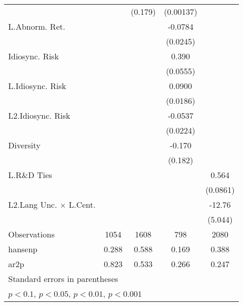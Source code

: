 \begin{table}
\begin{center}
{\begin{tabular}{l*{4}{c}}
                    &                     &     (0.179)         &   (0.00137)         &                     \\
L.Abnorm. Ret.      &                     &                     &     -0.0784\sym{**} &                     \\
                    &                     &                     &    (0.0245)         &                     \\
Idiosync. Risk      &                     &                     &       0.390\sym{***}&                     \\
                    &                     &                     &    (0.0555)         &                     \\
L.Idiosync. Risk    &                     &                     &      0.0900\sym{***}&                     \\
                    &                     &                     &    (0.0186)         &                     \\
L2.Idiosync. Risk   &                     &                     &     -0.0537\sym{*}  &                     \\
                    &                     &                     &    (0.0224)         &                     \\
Diversity           &                     &                     &      -0.170         &                     \\
                    &                     &                     &     (0.182)         &                     \\
L.R\&D Ties         &                     &                     &                     &       0.564\sym{***}\\
                    &                     &                     &                     &    (0.0861)         \\
L2.Lang Unc. $\times$ L.Cent.&                     &                     &                     &      -12.76\sym{*}  \\
                    &                     &                     &                     &     (5.044)         \\
\hline
Observations        &        1054         &        1608         &         798         &        2080         \\
hansenp             &       0.288         &       0.588         &       0.169         &       0.388         \\
ar2p                &       0.823         &       0.533         &       0.266         &       0.247         \\
\hline\hline
\multicolumn{5}{l}{\footnotesize Standard errors in parentheses}\\
\multicolumn{5}{l}{\footnotesize \sym{+} \(p<0.1\), \sym{*} \(p<0.05\), \sym{**} \(p<0.01\), \sym{***} \(p<0.001\)}\\
\end{tabular}
}
\end{center}
\end{table}



